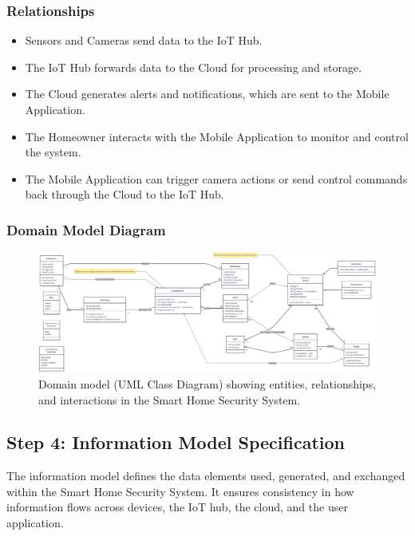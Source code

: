 \documentclass[conference]{IEEEtran}
\begin{document}
\subsubsection{Relationships}
\begin{itemize}
    \item Sensors and Cameras send data to the IoT Hub.
    \item The IoT Hub forwards data to the Cloud for processing and storage.
    \item The Cloud generates alerts and notifications, which are sent to the Mobile Application.
    \item The Homeowner interacts with the Mobile Application to monitor and control the system.
    \item The Mobile Application can trigger camera actions or send control commands back through the Cloud to the IoT Hub.
\end{itemize}

\subsubsection{Domain Model Diagram}
\begin{figure}[htbp]
\centerline{\includegraphics[width=0.9\columnwidth]{domain_model.png}}
\caption{Domain model (UML Class Diagram) showing entities, relationships, and interactions in the Smart Home Security System.}
\label{fig:domain-model}
\end{figure}



\subsection{Step 4: Information Model Specification}
The information model defines the data elements used, generated, and exchanged within the Smart Home Security System. It ensures consistency in how information flows across devices, the IoT hub, the cloud, and the user application.
\end{document}
